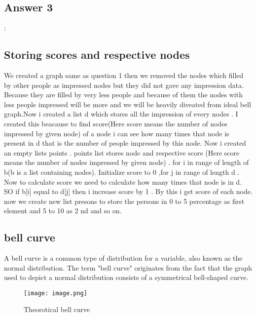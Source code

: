 \documentclass{article}
\begin{document}
\subsection{Answer 3}:
\subsection{Storing scores and respective nodes}We created a graph same as question 1 then we removed the nodes which filled by other people as impressed nodes  but they did not gave any impression data. Because they are filled by very less people and because of them the nodes with less people impressed will be more and we will be heavily diveated from ideal bell graph.Now i created a list d which stores all the impression of every nodes . I created this beacause to find score(Here score means the number of nodes impressed by given node)  of a node i can see how many times that node is present in d that is the number of people impressed by this node. Now i created an empty lists points . points list stores node and respective score (Here score means the number of nodes impressed by given node) . for i in range of length of b(b is a list containing nodes). Initialize score to 0 ,for j in range of length d . Now to calculate score we need to calculate how many times that node is in d. SO if b[i] equal to d[j] then i increase score by 1 . By this i get score of each node. now we create new list presons to store the persons in 0 to 5 percentage as first element and 5 to 10 as 2 nd and so on.
\subsection{bell curve}
A bell curve is a common type of distribution for a variable, also known as the normal distribution. The term "bell curve" originates from the fact that the graph used to depict a normal distribution consists of a symmetrical bell-shaped curve.

\begin{figure}
    \centering
    \texttt{[image: image.png]}
    \caption{Theorotical bell curve}
    \label{fig:enter-label}
\end{figure}
\newpage
\end{document}
